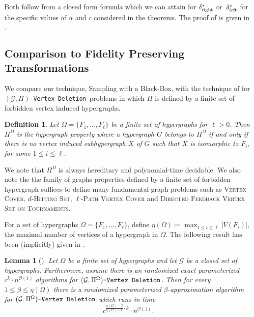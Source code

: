 \documentclass[letterpaper,11pt]{article}
\newcommand{\abs}[1]{{\left| #1\right|}}
\newcommand{\1}[1]{\mathds{1}\left[#1\right]}
\newcommand{\Oh}{\mathcal{O}}
\newtheorem{lemma}[theorem]{Lemma}
\newtheorem{definition}[theorem]{Definition}
\newcommand{\nmgpivd}[1][\mathcal{G},\Pi]{$(#1)$\textnormal{\texttt{-Vertex Deletion}}}
\newcommand{\gpivd}[1][\mathcal{G},\Pi]{(#1)\textnormal{\texttt{-Vertex Deletion}}}
\newcommand{\cG}{\mathcal{G}}
\newcommand{\vc}{\textsc{Vertex Cover}\xspace}
\newcommand{\pathvc}[1]{\ensuremath{#1}\textsc{-Path Vertex Cover}\xspace}
\newcommand{\hs}[1]{\ensuremath{#1}\textsc{-Hitting Set}\xspace}
\newcommand{\dfvst}{\textsc{Directed Feedback Vertex Set on Tournaments}\xspace}
\newcommand{\sdeltal}{\delta^{*}_{\textnormal{left}}}
\newcommand{\sdeltar}{\delta^{*}_{\textnormal{right}}}
\begin{document}
Both   follow from a closed form formula which we can attain for $\sdeltar$ or~$\sdeltal$  for the specific values of $\alpha$ and $c$ considered in the theorems. The proof of  is given in . 

\subsection{Comparison to Fidelity Preserving Transformations}
\label{sec:comparison}


We compare our technique, Sampling with a Black-Box, with the technique of \cite{Fellows2018} for \nmgpivd\  problems in which $\Pi$ is defined by a finite set of forbidden vertex  induced hypergraphs. 

\begin{definition}\label{definition:forbidden_hypergraph}
	Let $\Omega = \{F_1, \ldots, F_\ell\} $ be a finite set of hypergraphs for $\ell > 0$.
		Then $\Pi^{\Omega}$ is the hypergraph property where  a hypergraph $G$ belongs to $\Pi^{\Omega}$
	if and only if there is no vertex induced subhypergraph $X$ of $G$ such that $X$ is isomorphic to $F_i$,
	for some $1 \leq i \leq \ell$.
\end{definition}
We note that $\Pi^{\Omega}$ is always hereditary and polynomial-time decidable.  We also note the the family of graphs properties defined by a finite set of forbidden hypergraph suffices to define many fundamental graph problems such as \vc, \hs{d}, \pathvc{\ell} and \dfvst.  

For a set of hypergraphs $\Omega = \{F_1, \ldots, F_\ell\}$, define
$\eta(\Omega) \coloneqq \max_{1 \leq i \leq \ell} \abs{V\left( F_i \right) }$, the maximal number of vertices of a hypergraph in $\Omega$. The following result has been (implicitly) given in  \cite{Fellows2018}.
\begin{lemma}[\cite{Fellows2018}]
	\label{lemma:fellows2018}
	Let $\Omega$ be a finite set of hypergraphs and let $\cG$ be a closed set of hypergraphs. Furthermore, assume there is an randomized exact parameterized $c^k \cdot n^{\Oh(1)}$ algorithms for $\gpivd[\cG, \Pi^{\Omega}]$. Then for every $1\leq\beta\leq \eta(\Omega)$ there is a randomized parameterized $\beta$-approximation algorithm for $\gpivd[\cG, \Pi^{\Omega}]$ which runs in time $$c^{\frac{\eta(\Omega)-\beta}{\eta(\Omega)-1}\cdot k}\cdot n^{\Oh(1)}.$$ 
\end{lemma}
\end{document}
